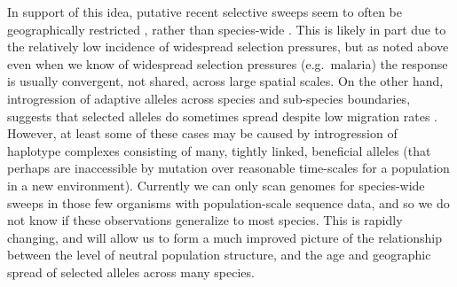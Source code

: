\documentclass{article}
\begin{document}
 
In support of this idea, putative recent selective sweeps seem to often be geographically restricted \citep{Pickrell:09,Coop:09,Granka:14},
rather than species-wide \citep[but see][ for a potential example]{Clark:07,Long:13}. 
This is likely in part due to the relatively low incidence of widespread selection pressures,
but as noted above even when we know of widespread selection
pressures (e.g.\ malaria) the response is usually convergent, not shared, across large spatial scales. 
On the other hand, 
introgression of adaptive alleles across species and sub-species boundaries, 
suggests that selected alleles do sometimes spread despite low
migration rates \citep[see ][ for a recent review]{hedrick2013adaptive}.
However, at least some of these cases 
may be caused by introgression of haplotype complexes
consisting of many, tightly linked, beneficial alleles (that perhaps
are inaccessible by mutation over reasonable time-scales for a population in a new
environment).  
Currently we can only scan genomes for species-wide sweeps
in those few organisms with population-scale sequence data, 
and so we do not know if these observations generalize to most species.
This is rapidly changing,
and will allow us to form a much improved picture of the relationship 
between the level of neutral population structure, 
and the age and geographic spread of selected alleles across many species.




\end{document}
